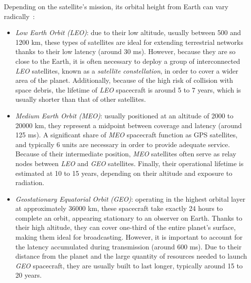 \documentclass[11pt,a4paper]{report}
\begin{document}
Depending on the satellite's mission, its orbital height from Earth can vary radically~\cite{LEO_MEO_GEO}:
\begin{itemize}
    \item \textit{Low Earth Orbit (LEO)}: due to their low altitude, usually between 500 and 1200 km, 
    these types of satellites are ideal for extending terrestrial networks thanks to their low latency (around 30 ms).
    However, because they are so close to the Earth, it is often necessary to deploy a group of interconnected \textit{LEO} satellites,
    known as a \textit{satellite constellation}, in order to cover a wider area of the planet.
    Additionally, because of the high risk of collision with space debris, the lifetime of \textit{LEO} spacecraft is around 5 to 7 years, 
    which is usually shorter than that of other satellites.

    \item \textit{Medium Earth Orbit (MEO)}: usually positioned at an altitude of 2000 to 20000 km, 
    they represent a midpoint between coverage and latency (around 125 ms). 
    A significant share of \textit{MEO} spacecraft function as GPS satellites, and typically 6 units are necessary in order to provide adequate service. 
    Because of their intermediate position, \textit{MEO} satellites often serve as relay nodes between \textit{LEO} and \textit{GEO} satellites. 
    Finally, their operational lifetime is estimated at 10 to 15 years, depending on their altitude and exposure to radiation.

    \item \textit{Geostationary Equatorial Orbit (GEO)}: operating in the highest orbital layer at approximately 36000 km,
    these spacecraft take exactly 24 hours to complete an orbit, appearing stationary to an observer on Earth. 
    Thanks to their high altitude, they can cover one-third of the entire planet's surface, making them ideal for broadcasting. 
    However, it is important to account for the latency accumulated during transmission (around 600 ms).
    Due to their distance from the planet and the large quantity of resources needed to launch \textit{GEO} spacecraft, they are usually built to last longer, typically around 15 to 20 years.

\end{itemize}
\end{document}
